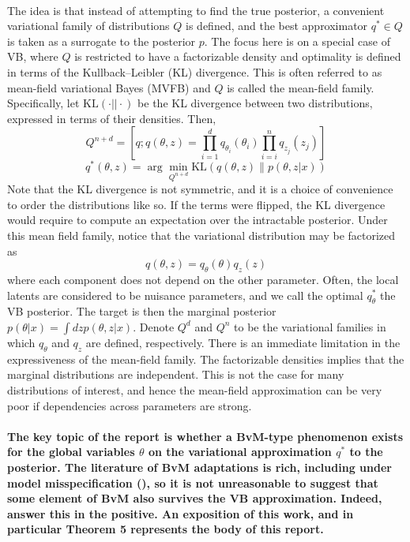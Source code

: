 \paragraph{} The idea is that instead of attempting to find the true posterior, a convenient variational family of distributions $Q$ is defined, and the best approximator $q^* \in Q$ is taken as a surrogate to the posterior $p$. The focus here is on a special case of VB, where $Q$ is restricted to have a factorizable density and optimality is defined in terms of the Kullback--Leibler (KL) divergence. This is often referred to as mean-field variational Bayes (MVFB) and $Q$ is called the mean-field family. Specifically, let $\text{KL}(\cdot || \cdot)$ be the KL divergence between two distributions, expressed in terms of their densities. Then,
\begin{equation}
Q^{n+d} = \left[ q; q(\theta, z) = \prod_{i=1}^d q_{\theta_i}(\theta_i) \prod_{i=i}^n q_{z_j}(z_j)  \right]
\end{equation}
\begin{equation}
\label{vbapprox}
q^*(\theta, z) = \arg \min_{Q^{n+d}} \text{KL}(q(\theta, z) \| p(\theta, z |x))
\end{equation}
Note that the KL divergence is not symmetric, and it is a choice of convenience to order the distributions like so. If the terms were flipped, the KL divergence would require to compute an expectation over the intractable posterior. Under this mean field family, notice that the variational distribution may be factorized as
\begin{equation}
\label{fact}
q(\theta,z) = q_{\theta}(\theta)q_{z}(z)
\end{equation}
%
where each component does not depend on the other parameter. Often, the local latents are considered to be nuisance parameters, and we call the optimal $q^*_{\theta}$ the VB posterior. The target is then the marginal posterior $p(\theta|x) = \int dz p(\theta, z |x)$. Denote $Q^d$ and $Q^n$ to be the variational families in which $q_{\theta}$ and $q_z$ are defined, respectively. There is an immediate limitation in the expressiveness of the mean-field family. The factorizable densities implies that the marginal distributions are independent. This is not the case for many distributions of interest, and hence the mean-field approximation can be very poor if dependencies across parameters are strong. 

\paragraph{} \textbf{The key topic of the report is whether a BvM-type phenomenon exists for the global variables $\theta$ on the variational approximation $q^*$ to the posterior. The literature of BvM adaptations is rich, including under model misspecification (\cite{kleijn2012}), so it is not unreasonable to suggest that some element of BvM also survives the VB approximation. Indeed, \cite{Wang:2019:VBVM} answer this in the positive. An exposition of this work, and in particular Theorem 5 represents the body of this report.} 

